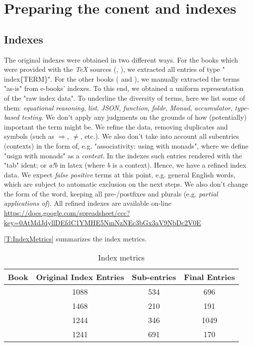 \section{Preparing the conent and indexes}
\label{S:PreparingContent}

\subsection*{Indexes}

The original indexes were obtained in two different ways. For the books which were provided with the \textit{TeX} sources (\pihTag{}, \craftTag{}), we extracted all entries of type "\\index\{TERM\}". For the other books (\lyahTag{} and \rwhTag{}), we manually extracted the terms "as-is" from e-books' indexes. To this end, we obtained a uniform representation of the "raw index data". To underline the diversity of terms, here we list some of them: \textit{equational reasoning}, \textit{list}, \textit{JSON}, \textit{function}, \textit{foldr}, \textit{Monad}, \textit{accumulator}, \textit{type-based testing}. We don't apply any judgments on the grounds of how (potentially) important the term might be. We refine the data, removing duplicates and symbols (such as \ensuremath{\Rightarrow}, \ensuremath{\neq}, etc.). We also don't take into account all subentries (contexts) in the form of, e.g. "associativity: using with monads", where we define "usign with monads" as a \textit{context}. In the indexes such entries rendered with the "tab" ident; or \textit{a!b} in latex (where \textit{b} is a context). Hence, we have a refined index data. We expect \textit{false positive} terms at this point, e.g. general English words, which are subject to automatic exclusion on the next steps. We also don't change the form of the word, keeping all pre-/postfixes and plurals (e.g. \textit{partial applications of}). All refined indexes are available on-line \url{https://docs.google.com/spreadsheet/ccc?key=0AtMdJdyllDEfdC1YMHE5NmNzNEc3bGx3aV9NbDc2V0E}

\autoref{T:IndexMetrics} summarizes the index metrics.

\begin{table}[ht!]
\begin{center}
\begin{tabular}{|l|c|c|c|}
  \hline
Book & Original Index Entries & Sub-entries & Final Entries \\ 
  \hline
    \craftTag{} & 1088 & 534 & 696 \\
    \pihTag{} & 1468 & 210 & 191 \\ 
    \rwhTag{} & 1244 & 346 & 1049 \\ 
    \lyahTag{} & 1241 & 691 & 170 \\ 
   \hline
\end{tabular}
\caption{Index metrics}
\label{T:IndexMetrics}
\end{center}
\end{table}

